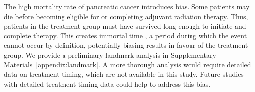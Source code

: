 The high mortality rate of pancreatic cancer introduces bias.
Some patients may die before becoming eligible for or completing adjuvant radiation therapy.
Thus, patients in the treatment group must have survived long enough to initiate and complete therapy.
This creates immortal time \citep{Levesque2010ImmortalTimeBias}, a period during which the event cannot occur by definition, potentially biasing results in favour of the treatment group.
We provide a preliminary landmark analysis \citep{Anderson1983TumorResponse, Putter2013Landmarking} in Supplementary Materials~\ref{appendix:landmark}.
A more thorough analysis would require detailed data on treatment timing, which are not available in this study. 
Future studies with detailed treatment timing data could help to address this bias.


